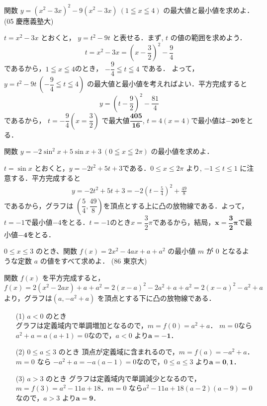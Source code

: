 \documentclass[a4paper,11pt]{ltjsarticle}
\begin{document}
\begin{toi}
関数 $y = (x^2 -3x)^2 -9(x^2 -3x) ~(1\leqq x\leqq4)$ の最大値と最小値を求めよ．\hfill (05 慶應義塾大)
\end{toi}
\ans 
$t = x^2 - 3x$ とおくと， $y = t^2 - 9t$ と表せる．まず,  $t$ の値の範囲を求めよう．
\[t = x^2 - 3x = \left(x - \frac{3}{2}\right)^2 - \frac{9}{4}\]
であるから，$1\leqq x\leqq 4$のとき， $-\dfrac{9}{4} \leqq t \leqq 4$ である．
よって， $y = t^2 - 9t~\left(-\dfrac{9}{4} \leqq t \leqq 4\right)$ の最大値と最小値を考えればよい．平方完成すると
\[y = \left(t - \frac{9}{2}\right)^2 - \frac{81}{4}\]
であるから， $t = -\dfrac{9}{4}\left(x=\dfrac32\right)$ で最大値$\boldsymbol{\dfrac{405}{16}}$, $t=4(x=4)$で最小値は$\boldsymbol{-20}$をとる．
　\\
\newpage
\begin{toi}
関数 $y =-2\sin^2x + 5\sin x +3~(0\leqq x\leqq 2\pi)$ の最小値を求めよ．
\end{toi}
\ans $t = \sin x$ とおくと，$y = -2t^2+5t+3$である．$0 \le x \le 2\pi$ より, $-1 \le t \le 1$ に注意する．平方完成すると
\begin{align*}
    y = -2t^2+5t+3=-2\left(t - \frac{5}{4}\right)^2 + \frac{49}{8}
\end{align*}
であるから，グラフは $\left( \dfrac{5}{4},\dfrac{49}{8}\right)$を頂点とする上に凸の放物線である．よって，
$t=-1$で最小値$ -4$をとる．$t=-1$のとき$x=\dfrac32\pi$であるから，結局，$\boldsymbol{x=\dfrac32\pi}$で最小値$\boldsymbol{-4}$をとる．
　\\
\begin{toi}
$0 \le x \le 3$ のとき、関数 $f(x) = 2x^2 - 4ax + a + a^2$ の最小値 $m$ が $0$ となるような定数 $a$ の値をすべて求めよ．
\hfill (86 東京大)
\end{toi}
\ans 
関数 $f(x)$ を平方完成すると，
\[f(x) = 2(x^2 - 2ax) + a + a^2 = 2(x - a)^2 - 2a^2 + a + a^2 = 2(x - a)^2 - a^2 + a\]
より，グラフは$(a, - a^2 + a)$ を頂点とする下に凸の放物線である．
\begin{itemize}
    \item [(1)]$a < 0$ のとき\\
グラフは定義域内で単調増加となるので，$m=f(0)=a^2+a$．
$m=0$なら $a^2+a=a(a+1)=0$なので，$a<0$ より$\boldsymbol{a=-1}$．
\item[(2)]${0 \le a \le 3}$ のとき
頂点が定義域に含まれるので，$m=f(a)=-a^2+a$．
$m=0$ なら $-a^2+a= -a(a-1)=0$なので，$0 \le a \le 3$ より$\boldsymbol{a=0, 1}$．
\item[(3)] ${a > 3}$ のとき
グラフは定義域内で単調減少となるので，$m=f(3)= a^2 - 11a + 18$．$m=0$ なら$a^2 - 11a + 18  (a-2)(a-9)=0$なので，$a>3$ より$\boldsymbol{a=9}$．
\end{itemize}
\end{document}
